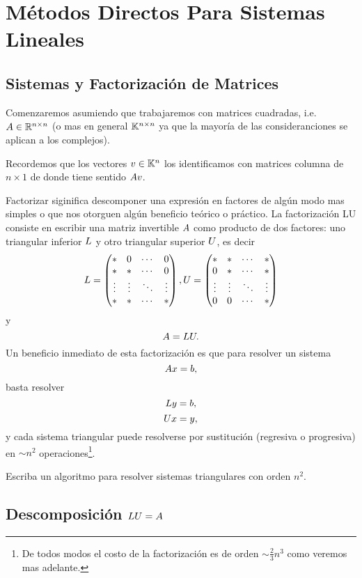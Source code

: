
\chapter{Métodos Directos Para Sistemas Lineales}
\setcounter{equation}{0}

\section{Sistemas y Factorización de Matrices}

Comenzaremos asumiendo que trabajaremos con matrices cuadradas, i.e.  $\Ab\in \R^{n\times n}$ (o mas en general
$\mathbb K^{n\times n}$ ya que la mayoría de las consideranciones se aplican a los complejos).

Recordemos que los vectores $\vb\in \Kn$ los identificamos con matrices columna de $n\times 1$ de donde tiene sentido $\Ab\vb$.

Factorizar siginifica descomponer una expresión en factores de algún modo mas simples o que nos otorguen algún beneficio teórico o práctico. La factorización
LU consiste en escribir una matriz invertible $\Ab$ como producto de dos factores: uno triangular inferior $\Lb$ y otro triangular superior $\Ub$, es decir
$$
\Lb= \begin{pmatrix}
*& 0 & \cdots & 0 \\
* & * & \cdots & 0 \\
\vdots  & \vdots  & \ddots & \vdots  \\
* & * & \cdots & *
\end{pmatrix},
\Ub= \begin{pmatrix}
*& * & \cdots & * \\
0 & * & \cdots & * \\
\vdots  & \vdots  & \ddots & \vdots  \\
0 & 0 & \cdots & *
\end{pmatrix}
$$
y
$$
\Ab=\Lb\Ub.
$$
Un beneficio inmediato de esta factorización es que para  resolver un sistema
$$
\Ab\xb=\bb,
$$
basta resolver
$$
\Lb\yb=\bb,
$$
$$
\Ub\xb=\yb,
$$
y cada sistema triangular puede resolverse por sustitución (regresiva o progresiva) en $\sim n^2$ operaciones\footnote{De todos modos el costo de la factorización es de orden $\sim \frac23 n^3$ como veremos mas adelante.}.
\begin{ejercicio} Escriba  un algoritmo para resolver sistemas triangulares con orden $n^2$.
\end{ejercicio}

\section{Descomposición $\Lb\Ub=\Ab$}

